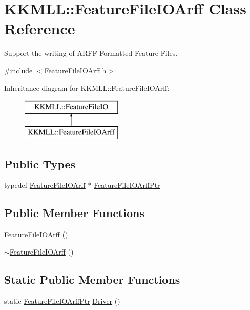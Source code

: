 \hypertarget{class_k_k_m_l_l_1_1_feature_file_i_o_arff}{}\section{K\+K\+M\+LL\+:\+:Feature\+File\+I\+O\+Arff Class Reference}
\label{class_k_k_m_l_l_1_1_feature_file_i_o_arff}


Support the writing of A\+R\+FF Formatted Feature Files.  




{\ttfamily \#include $<$Feature\+File\+I\+O\+Arff.\+h$>$}

Inheritance diagram for K\+K\+M\+LL\+:\+:Feature\+File\+I\+O\+Arff\+:\begin{figure}[H]
\begin{center}
\leavevmode
\includegraphics[height=2.000000cm]{class_k_k_m_l_l_1_1_feature_file_i_o_arff}
\end{center}
\end{figure}
\subsection*{Public Types}
\begin{DoxyCompactItemize}
\item 
typedef \hyperlink{class_k_k_m_l_l_1_1_feature_file_i_o_arff}{Feature\+File\+I\+O\+Arff} $\ast$ \hyperlink{class_k_k_m_l_l_1_1_feature_file_i_o_arff_a131bf2bfec59d3ecc772cb03092db122}{Feature\+File\+I\+O\+Arff\+Ptr}
\end{DoxyCompactItemize}
\subsection*{Public Member Functions}
\begin{DoxyCompactItemize}
\item 
\hyperlink{class_k_k_m_l_l_1_1_feature_file_i_o_arff_a16ba967b959f6202de3d60daa0d7fbdf}{Feature\+File\+I\+O\+Arff} ()
\item 
\hyperlink{class_k_k_m_l_l_1_1_feature_file_i_o_arff_a717e418fe08c4ceaf2fb65366679d9f9}{$\sim$\+Feature\+File\+I\+O\+Arff} ()
\end{DoxyCompactItemize}
\subsection*{Static Public Member Functions}
\begin{DoxyCompactItemize}
\item 
static \hyperlink{class_k_k_m_l_l_1_1_feature_file_i_o_arff_a131bf2bfec59d3ecc772cb03092db122}{Feature\+File\+I\+O\+Arff\+Ptr} \hyperlink{class_k_k_m_l_l_1_1_feature_file_i_o_arff_afaf57d47ecff3c82b0bd0d3596760145}{Driver} ()
\end{DoxyCompactItemize}

